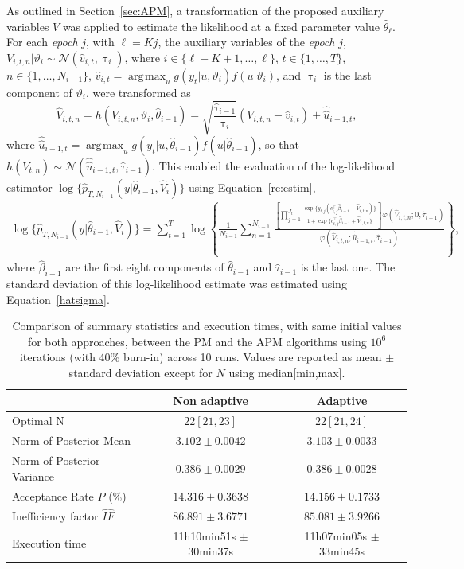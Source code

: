 \documentclass[pdflatex,sn-mathphys-num]{sn-jnl}
\DeclareMathOperator*{\argmax}{\arg\!\max}
\theoremstyle{thmstyleone}
\theoremstyle{thmstyletwo}
\theoremstyle{thmstylethree}
\begin{document}
As outlined in Section~\ref{sec:APM}, a transformation of the proposed auxiliary variables \( V \) was applied to estimate the likelihood at a fixed parameter value \( \hat{\theta}_\ell \). For each \textit{epoch} \( j \), with \( \ell = Kj \), the auxiliary variables of the \textit{epoch} $j$, \( V_{i,t,n}|\vartheta_i \sim \mathcal{N}(\hat {v}_{i,t}, \uptau_{i}) \), where \( i \in \{\ell-K+1, \ldots, \ell\} \), $t \in \{1, \ldots, T\} $, $n \in \{1, \ldots, N_{i-1}\}$, $\hat {v}_{i,t} = \argmax_{u}  g(y_t | u, \vartheta_i) f(u | \vartheta_i)$,  and $\uptau_i$ is the last component of $\vartheta_i$, were transformed as
\[
\widehat{V}_{i,t,n} = h(V_{i,t,n}, \vartheta_i, \hat\theta_{i-1}) = \sqrt{\frac{\hat \tau_{i-1}}{\uptau_{i}}}(V_{i,t,n} - \hat {v}_{i,t}) + \widehat{\hat{u}}_{i-1,t},
\]
where $\widehat{\hat{u}}_{i-1,t}=\argmax_{u}  g(y_t | u, \hat\theta_{i-1}) f(u | \hat\theta_{i-1})$, so that \( h(V_{t,n}) \sim \mathcal{N}\left(\widehat{\hat{u}}_{i-1,t}, \hat \tau_{i-1}\right) \). This enabled the evaluation of the log-likelihood estimator \( \log\{\widehat{p}_{T,N_{i-1}}(y|\hat\theta_{i-1},\widehat{V}_i)\} \) using Equation~\eqref{re:estim}, 
{\small
\begin{align*}
    \log\{\widehat{p}_{T,N_{i-1}}(y|\hat\theta_{i-1},\widehat{V}_i)\}
= \sum_{t=1}^T \log\left\{ \frac{1}{N_{i-1}} \sum_{n=1}^{N_{i-1}} 
\frac{\left[ \prod_{j=1}^{J_t} \frac{\exp\{y_{t,j}(c_{t,j}^\top \hat\beta_{i-1} + \widehat{V}_{i,t,n})\}}{1 + \exp\{c_{t,j}^\top \hat\beta_{i-1} + \widehat{V}_{i,t,n}\}} \right] \varphi(\widehat{V}_{i,t,n}; 0, \hat\tau_{i-1})}{\varphi(\widehat{V}_{i,t,n}; \widehat{\hat{u}}_{i-1,t}, \hat\tau_{i-1})} \right \},
\end{align*}
}
where $\hat\beta_{i-1}$ are the first eight components of $\hat\theta_{i-1}$ and $ \hat\tau_{i-1}$ is the last one. The standard deviation of this log-likelihood estimate was estimated using Equation~\eqref{hatsigma}.
\begin{table}[h]
\caption{Comparison of summary statistics and execution times, with same initial values for both approaches, between the PM and the APM algorithms using $10^6$ iterations (with 40\% burn-in) across 10 runs. Values are reported as mean $\pm$ standard deviation except for $N$ using median[min,max].}
  \centering
  \begin{tabular}{lcc}
    \hline
     & Non adaptive & Adaptive \\
    \hline
    Optimal N & $22[21,23]$ & $22[21,24]$\\
    Norm of Posterior Mean & $3.102 \pm 0.0042$ & $3.103 \pm 0.0033$ \\
    Norm of Posterior Variance & $0.386 \pm 0.0029$ & $0.386 \pm 0.0028$ \\
    Acceptance Rate $\widehat{P}$ (\%) & $14.316 \pm 0.3638$ & $14.156 \pm 0.1733$ \\
    Inefficiency factor $\widehat{IF}$ & $86.891 \pm 3.6771$ & $85.081 \pm 3.9266$ \\
    Execution time & {11h10min51s} $\pm$ 30min37s& {11h07min05s} $\pm$ 33min45s \\
    \hline
  \end{tabular}
  \label{re:tab3}
\end{table}
\end{document}
